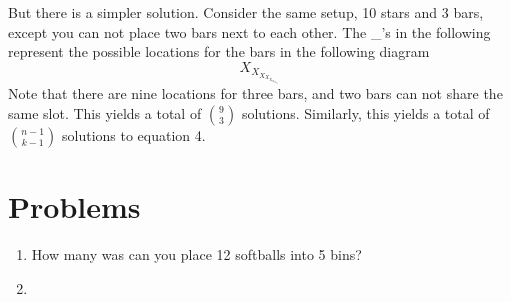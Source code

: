 \documentclass[11pt]{article}
\begin{document}
    But there is a simpler solution. Consider the same setup, 10 stars and 3 bars, except you can not place two bars next to each other. The _'s in the following represent the possible locations for the bars in the following diagram
    \begin{equation}
        X_X_X_X_X_X_X_X_X_X
    \end{equation}
    Note that there are nine locations for three bars, and two bars can not share the same slot. This yields a total of $\binom{9}{3}$ solutions. Similarly, this yields a total of $\binom{n-1}{k-1}$ solutions to equation 4.
    \section{Problems}
    \begin{enumerate}
        \item How many was can you place 12 softballs into 5 bins?
        \item
    \end{enumerate}
\end{document}

